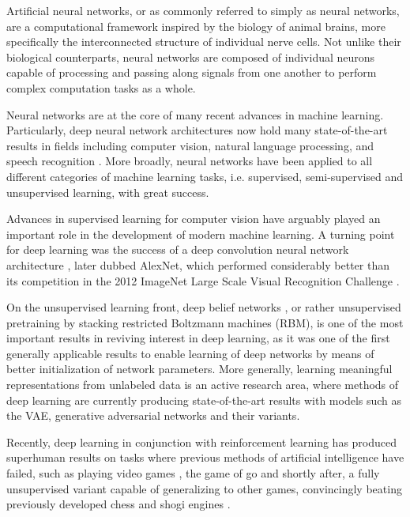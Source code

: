 Artificial neural networks, or as commonly referred to simply as neural networks, are a computational framework inspired by the biology of animal brains, more specifically the interconnected structure of individual nerve cells. Not unlike their biological counterparts, neural networks are composed of individual neurons capable of processing and passing along signals from one another to perform complex computation tasks as a whole.

Neural networks are at the core of many recent advances in machine learning. Particularly, deep neural network architectures now hold many state-of-the-art results in fields including computer vision, natural language processing, and speech recognition \cite{deep_learning}. More broadly, neural networks have been applied to all different categories of machine learning tasks, i.e. supervised, semi-supervised and unsupervised learning, with great success.

Advances in supervised learning for computer vision have arguably played an important role in the development of modern machine learning. A turning point for deep learning was the success of a deep convolution neural network architecture \cite{imagenet_alexnet}, later dubbed AlexNet, which performed considerably better than its competition in the 2012 ImageNet Large Scale Visual Recognition Challenge \cite{imagenet, imagenet_challenge}.

On the unsupervised learning front, deep belief networks \cite{deep_belief_nets, hinton_deep_belief_nets}, or rather unsupervised pretraining by stacking restricted Boltzmann machines (RBM), is one of the most important results in reviving interest in deep learning, as it was one of the first generally applicable results to enable learning of deep networks by means of better initialization of network parameters. More generally, learning meaningful representations from unlabeled data is an active research area, where methods of deep learning are currently producing state-of-the-art results with models such as the VAE, generative adversarial networks \cite{gan} and their variants.

Recently, deep learning in conjunction with reinforcement learning has produced superhuman results on tasks where previous methods of artificial intelligence have failed, such as playing video games \cite{deep_atari}, the game of go \cite{alphago} and shortly after, a fully unsupervised variant capable of generalizing to other games, convincingly beating previously developed chess and shogi engines \cite{alphazero, alphazero_generalized}.

